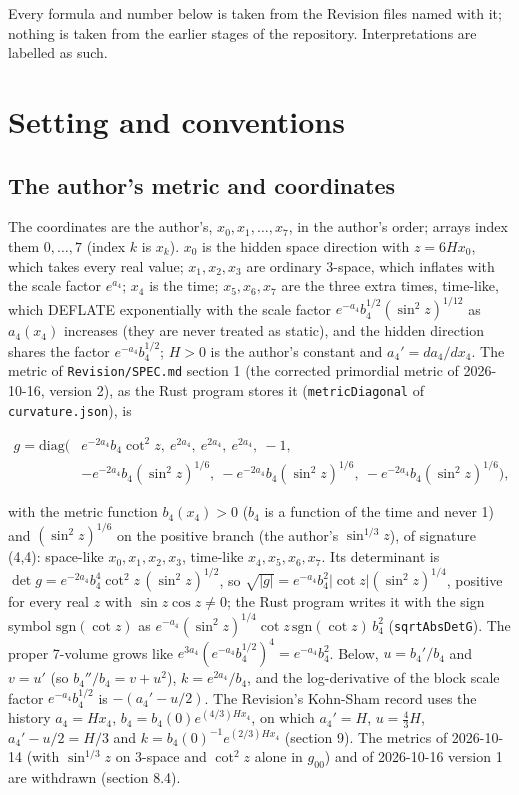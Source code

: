 \documentclass[11pt]{article}
\begin{document}
Every formula and number below is taken from the Revision files named with it; nothing is taken from the earlier stages of the repository. Interpretations are labelled as such.

\section{Setting and conventions}

\subsection{The author's metric and coordinates}

The coordinates are the author's, $x_0, x_1, \dots, x_7$, in the author's order; arrays index them $0, \dots, 7$ (index $k$ is $x_k$). $x_0$ is the hidden space direction with $z = 6Hx_0$, which takes every real value; $x_1, x_2, x_3$ are ordinary 3-space, which inflates with the scale factor $e^{a_4}$; $x_4$ is the time; $x_5, x_6, x_7$ are the three extra times, time-like, which DEFLATE exponentially with the scale factor $e^{-a_4}b_4^{1/2}(\sin^2z)^{1/12}$ as $a_4(x_4)$ increases (they are never treated as static), and the hidden direction shares the factor $e^{-a_4}b_4^{1/2}$; $H > 0$ is the author's constant and $a_4' = da_4/dx_4$. The metric of \texttt{Revision\allowbreak{}/SPEC.md} section 1 (the corrected primordial metric of 2026-10-16, version 2), as the Rust program stores it (\texttt{metricDi\allowbreak{}agonal} of \texttt{curvatur\allowbreak{}e.json}), is

\[
\begin{aligned}
g = \mathrm{diag}\big(& e^{-2a_4}b_4\cot^2 z,\ e^{2a_4},\ e^{2a_4},\ e^{2a_4},\ -1, \\
& -e^{-2a_4}b_4(\sin^2z)^{1/6},\ -e^{-2a_4}b_4(\sin^2z)^{1/6},\ -e^{-2a_4}b_4(\sin^2z)^{1/6}\big),
\end{aligned}
\]

with the metric function $b_4(x_4) > 0$ ($b_4$ is a function of the time and never 1) and $(\sin^2z)^{1/6}$ on the positive branch (the author's $\sin^{1/3}z$), of signature (4,4): space-like $x_0, x_1, x_2, x_3$, time-like $x_4, x_5, x_6, x_7$. Its determinant is $\det g = e^{-2a_4}b_4^4\cot^2z\,(\sin^2z)^{1/2}$, so $\sqrt{|g|} = e^{-a_4}b_4^2|\cot z|(\sin^2z)^{1/4}$, positive for every real $z$ with $\sin z\cos z \neq 0$; the Rust program writes it with the sign symbol $\mathrm{sgn}(\cot z)$ as $e^{-a_4}(\sin^2z)^{1/4}\cot z\,\mathrm{sgn}(\cot z)\,b_4^2$ (\texttt{sqrtAbsD\allowbreak{}etG}). The proper 7-volume grows like $e^{3a_4}(e^{-a_4}b_4^{1/2})^4 = e^{-a_4}b_4^2$. Below, $u = b_4'/b_4$ and $v = u'$ (so $b_4''/b_4 = v + u^2$), $k = e^{2a_4}/b_4$, and the log-derivative of the block scale factor $e^{-a_4}b_4^{1/2}$ is $-(a_4' - u/2)$. The Revision's Kohn-Sham record uses the history $a_4 = Hx_4$, $b_4 = b_4(0)e^{(4/3)Hx_4}$, on which $a_4' = H$, $u = \frac43H$, $a_4' - u/2 = H/3$ and $k = b_4(0)^{-1}e^{(2/3)Hx_4}$ (section 9). The metrics of 2026-10-14 (with $\sin^{1/3}z$ on 3-space and $\cot^2z$ alone in $g_{00}$) and of 2026-10-16 version 1 are withdrawn (section 8.4).
\end{document}
